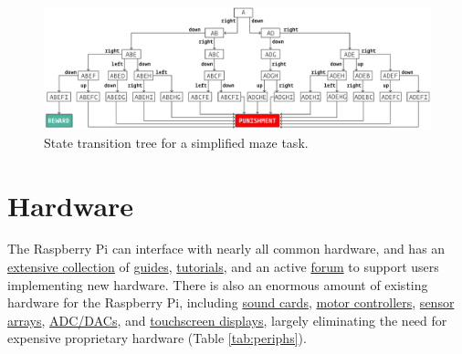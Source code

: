 \documentclass[nohyper, justified, notitlepage, marginals=raggedright,twoside=false,debug]{tufte-autopilot}
\begin{document}
\begin{figure}[hb!]
\caption{State transition tree for a simplified maze task.}
\label{fig:fsmtree}
\includegraphics[]{figures/maze.pdf}
\end{figure}

\clearpage
\section{Hardware}
\label{sec:hardware}

The Raspberry Pi can interface with nearly all common hardware, and has an \href{https://www.raspberrypi.org/help/}{extensive collection} of \href{https://elinux.org/RPi_Guides}{guides}, \href{https://elinux.org/RPi_Tutorials}{tutorials}, and an active \href{https://www.raspberrypi.org/forums/}{forum} to support users implementing new hardware. There is also an enormous amount of existing hardware for the Raspberry Pi, including \href{https://www.hifiberry.com/}{sound cards}, \href{https://www.adafruit.com/product/2348}{motor controllers}, \href{https://www.digikey.com/product-detail/en/raspberry-pi/SENSE-HAT/1690-1013-ND/6196429}{sensor arrays}, \href{https://www.seeedstudio.com/Raspberry-Pi-High-Precision-AD-DA-Board-p-2765.html}{ADC/DACs}, and \href{https://www.digikey.com/product-detail/en/pimoroni-ltd/PIM369/1778-1221-ND/9521981}{touchscreen displays}, largely eliminating the need for expensive proprietary hardware (Table \ref{tab:periphs}). 
\end{document}

